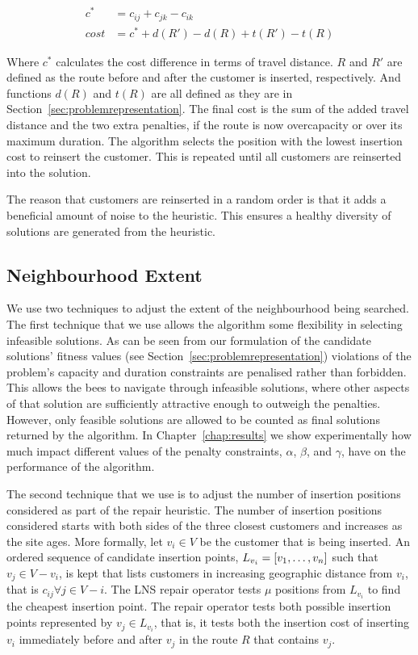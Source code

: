\begin{align}
   c^*   &= c_{ij} + c_{jk} - c_{ik} \\
   cost  &= c^* + d(R') - d(R) + t(R') - t(R)
\end{align}

Where $c^*$ calculates the cost difference in terms of travel distance. $R$ and $R'$ are defined as the route before and after the customer is inserted, respectively. And functions $d(R)$ and $t(R)$ are all defined as they are in Section~\ref{sec:problemrepresentation}. The final cost is the sum of the added travel distance and the two extra penalties, if the route is now overcapacity or over its maximum duration. The algorithm selects the position with the lowest insertion cost to reinsert the customer. This is repeated until all customers are reinserted into the solution. 

The reason that customers are reinserted in a random order is that it adds a beneficial amount of noise to the heuristic. This ensures a healthy diversity of solutions are generated from the heuristic. 

\subsection{Neighbourhood Extent}
\label{subsec:neighborhoodscope}

We use two techniques to adjust the extent of the neighbourhood being searched. The first technique that we use allows the algorithm some flexibility in selecting infeasible solutions. As can be seen from our formulation of the candidate solutions' fitness values (see Section~\ref{sec:problemrepresentation}) violations of the problem's capacity and duration constraints are penalised rather than forbidden. This allows the bees to navigate through infeasible solutions, where other aspects of that solution are sufficiently attractive enough to outweigh the penalties. However, only feasible solutions are allowed to be counted as final solutions returned by the algorithm. In Chapter~\ref{chap:results} we show experimentally how much impact different values of the penalty constraints, $\alpha$, $\beta$, and $\gamma$, have on the performance of the algorithm.

The second technique that we use is to adjust the number of insertion positions considered as part of the repair heuristic. The number of insertion positions considered starts with both sides of the three closest customers and increases as the site ages. More formally, let $v_i \in V$ be the customer that is being inserted. An ordered sequence of candidate insertion points, $L_{v_i} = [v_1,\ldots,v_n]$ such that $v_j \in V - v_i$, is kept that lists customers in increasing geographic distance from $v_i$, that is $c_{ij} \forall j \in V - i$. The LNS repair operator tests $\mu$ positions from $L_{v_i}$ to find the cheapest insertion point. The repair operator tests both possible insertion points represented by $v_j \in L_{v_i}$, that is, it tests both the insertion cost of inserting $v_i$ immediately before and after $v_j$ in the route $R$ that contains $v_j$. 

